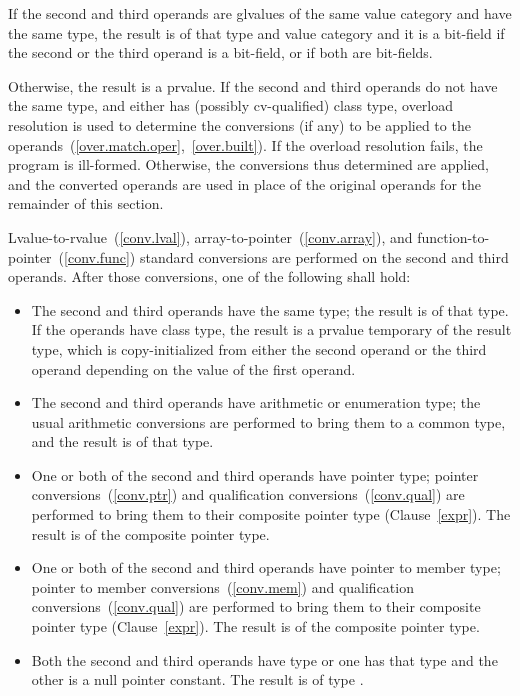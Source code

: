 \pnum
If the second and third operands are glvalues of the same value category
and have the same type, the
result is of that type and value category and it is a bit-field if the
second or the third operand is a bit-field, or if both are bit-fields.

\pnum
Otherwise, the result is a prvalue. If the second and third operands do
not have the same type, and either has (possibly cv-qualified) class
type, overload resolution is used to determine the conversions (if any)
to be applied to the operands~(\ref{over.match.oper},~\ref{over.built}).
If the overload resolution fails, the program is ill-formed. Otherwise,
the conversions thus determined are applied, and the converted operands
are used in place of the original operands for the remainder of this
section.

\pnum
Lvalue-to-rvalue~(\ref{conv.lval}), array-to-pointer~(\ref{conv.array}),
and function-to-pointer~(\ref{conv.func}) standard conversions are
performed on the second and third operands. After those conversions, one
of the following shall hold:

\begin{itemize}
\item The second and third operands have the same type; the result is of
that type. If the operands have class type, the result is a prvalue
temporary of the result type, which is copy-initialized from either the
second operand or the third operand depending on the value of the first
operand.

\item The second and third operands have arithmetic or enumeration type;
the usual arithmetic conversions are performed to bring them to a common
type, and the result is of that type.

\item One or both of the second and third operands have pointer type; pointer
conversions~(\ref{conv.ptr}) and qualification
conversions~(\ref{conv.qual}) are performed to bring them to their
composite pointer type (Clause~\ref{expr}). The result is of the composite
pointer type.

\item One or both of the second and third operands have pointer to member type;
pointer to member conversions~(\ref{conv.mem}) and qualification
conversions~(\ref{conv.qual}) are performed to bring them to their composite
pointer type (Clause~\ref{expr}). The result is of the composite pointer type.

\item
Both the second and third operands have type  or one has
that type and the other is a null pointer constant. The result is of type
.

\end{itemize}

